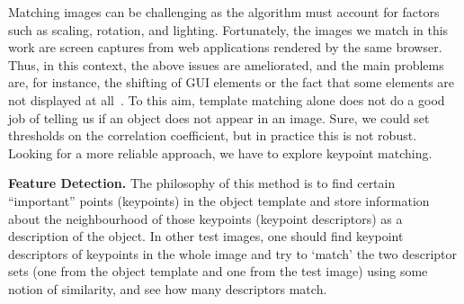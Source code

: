 Matching images can be challenging as the algorithm must account for factors such as scaling, rotation, and lighting. Fortunately, the images we match in this work are screen captures from web applications rendered by the same browser. Thus, in this context, the above issues are ameliorated, and the main problems are, for instance, the shifting of GUI elements or the fact that some elements are not displayed at all~\cite{}.
% 
To this aim, template matching alone does not do a good job of telling us if an object does not appear in an image. Sure, we could set thresholds on the correlation coefficient, but in practice this is not robust. Looking for a more reliable approach, we have to explore keypoint matching.

\noindent
\textbf{Feature Detection.}
The philosophy of this method is to find certain ``important'' points (keypoints) in the object template and store information about the neighbourhood of those keypoints (keypoint descriptors) as a description of the object. In other test images, one should find keypoint descriptors of keypoints in the whole image and try to `match' the two descriptor sets (one from the object template and one from the test image) using some notion of similarity, and see how many descriptors match.



